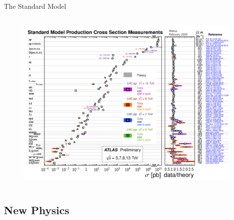\documentclass[aspectratio=169,xcolor=table]{beamer}
\begin{document}
\begin{frame}[c]{The Standard Model}
\begin{columns}
\begin{figure}
        \includegraphics[width=\textwidth,keepaspectratio=true]{ATLAS_d_SMSummary_FiducialXsect_rotated.png}
        \caption{\tiny \cite{ATLAS-SM-xsec}}
      \end{figure}
    \end{columns}
  \end{frame}

  \subsection{New Physics }
\end{document}
